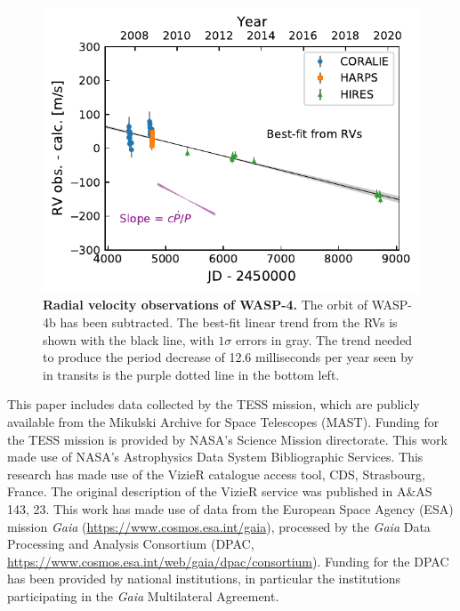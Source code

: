 \documentclass[RNAAS]{aastex62}
\begin{document}
\begin{figure}
    \begin{center}
		\includegraphics{rv_fit.pdf}
    \end{center}
    \vspace{-0.8cm}
    \caption{
      {\bf Radial velocity observations of WASP-4.}
      The orbit of WASP-4b has been subtracted.  The best-fit linear
      trend from the RVs is shown with the black line, with $1\sigma$
      errors in gray. The trend needed to produce the period decrease
      of 12.6 milliseconds per year seen by \citet{bouma_wasp-4b_2019}
      in transits is the purple dotted line in the bottom left.
     \label{fig:rv_o_minus_c}
    }
\end{figure}


\acknowledgements
%
This paper includes data collected by the TESS mission, which are
publicly available from the Mikulski Archive for Space Telescopes
(MAST).
%
Funding for the TESS mission is provided by NASA's Science Mission
directorate.
%
This work made use of NASA's Astrophysics Data System Bibliographic
Services.
%
This research has made use of the VizieR catalogue access tool, CDS,
Strasbourg, France. The original description of the VizieR service was
published in A\&AS 143, 23.
%
This work has made use of data from the European Space Agency (ESA)
mission {\it Gaia} (\url{https://www.cosmos.esa.int/gaia}), processed
by the {\it Gaia} Data Processing and Analysis Consortium (DPAC,
\url{https://www.cosmos.esa.int/web/gaia/dpac/consortium}). Funding
for the DPAC has been provided by national institutions, in particular
the institutions participating in the {\it Gaia} Multilateral
Agreement.
%
\newline
%

                            
 
\end{document}
